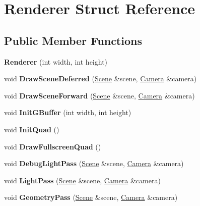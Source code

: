 \hypertarget{structRenderer}{}\section{Renderer Struct Reference}
\label{structRenderer}
\subsection*{Public Member Functions}
\begin{DoxyCompactItemize}
\item 
\mbox{\label{structRenderer_af72dee9cedcc9e481dd3d313bac11b62}} 
{\bfseries Renderer} (int width, int height)
\item 
\mbox{\label{structRenderer_afd52dc77ef5b02e6cc3047a773f51e18}} 
void {\bfseries Draw\+Scene\+Deferred} (\mbox{\hyperlink{structScene}{Scene}} \&scene, \mbox{\hyperlink{structCamera}{Camera}} \&camera)
\item 
\mbox{\label{structRenderer_a108d3b7ca0673a352ec4e5280606719e}} 
void {\bfseries Draw\+Scene\+Forward} (\mbox{\hyperlink{structScene}{Scene}} \&scene, \mbox{\hyperlink{structCamera}{Camera}} \&camera)
\item 
\mbox{\label{structRenderer_a3632d18456a6891c573bae960eb726a7}} 
void {\bfseries Init\+G\+Buffer} (int width, int height)
\item 
\mbox{\label{structRenderer_a70b1d8926675c08e7204c7e9130d202d}} 
void {\bfseries Init\+Quad} ()
\item 
\mbox{\label{structRenderer_ade2c467e62502725e1c36a979f600271}} 
void {\bfseries Draw\+Fullscreen\+Quad} ()
\item 
\mbox{\label{structRenderer_a8588b8e6c8dad28d6420a6f3138294e2}} 
void {\bfseries Debug\+Light\+Pass} (\mbox{\hyperlink{structScene}{Scene}} \&scene, \mbox{\hyperlink{structCamera}{Camera}} \&camera)
\item 
\mbox{\label{structRenderer_ad56111d423984eef23ef663996a2cdda}} 
void {\bfseries Light\+Pass} (\mbox{\hyperlink{structScene}{Scene}} \&scene, \mbox{\hyperlink{structCamera}{Camera}} \&camera)
\item 
\mbox{\label{structRenderer_a98e02ef7093ded2d81755a05ea1c2f15}} 
void {\bfseries Geometry\+Pass} (\mbox{\hyperlink{structScene}{Scene}} \&scene, \mbox{\hyperlink{structCamera}{Camera}} \&camera)
\end{DoxyCompactItemize}
